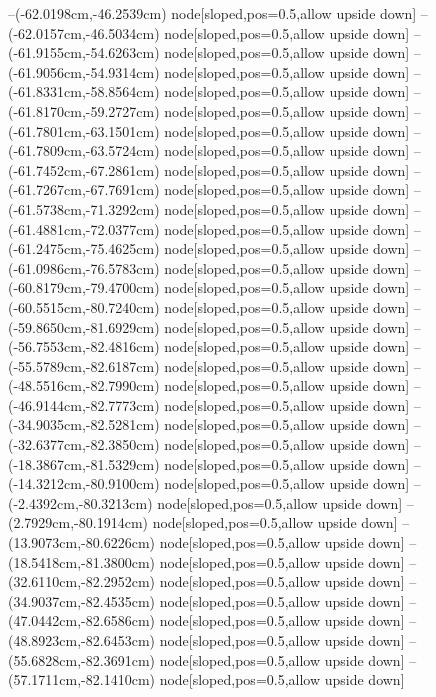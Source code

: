 --(-62.0198cm,-46.2539cm) node[sloped,pos=0.5,allow upside down]{\ArrowIn}
--(-62.0157cm,-46.5034cm) node[sloped,pos=0.5,allow upside down]{\arrowIn}
--(-61.9155cm,-54.6263cm) node[sloped,pos=0.5,allow upside down]{\ArrowIn}
--(-61.9056cm,-54.9314cm) node[sloped,pos=0.5,allow upside down]{\arrowIn}
--(-61.8331cm,-58.8564cm) node[sloped,pos=0.5,allow upside down]{\ArrowIn}
--(-61.8170cm,-59.2727cm) node[sloped,pos=0.5,allow upside down]{\arrowIn}
--(-61.7801cm,-63.1501cm) node[sloped,pos=0.5,allow upside down]{\ArrowIn}
--(-61.7809cm,-63.5724cm) node[sloped,pos=0.5,allow upside down]{\arrowIn}
--(-61.7452cm,-67.2861cm) node[sloped,pos=0.5,allow upside down]{\ArrowIn}
--(-61.7267cm,-67.7691cm) node[sloped,pos=0.5,allow upside down]{\arrowIn}
--(-61.5738cm,-71.3292cm) node[sloped,pos=0.5,allow upside down]{\ArrowIn}
--(-61.4881cm,-72.0377cm) node[sloped,pos=0.5,allow upside down]{\arrowIn}
--(-61.2475cm,-75.4625cm) node[sloped,pos=0.5,allow upside down]{\ArrowIn}
--(-61.0986cm,-76.5783cm) node[sloped,pos=0.5,allow upside down]{\ArrowIn}
--(-60.8179cm,-79.4700cm) node[sloped,pos=0.5,allow upside down]{\ArrowIn}
--(-60.5515cm,-80.7240cm) node[sloped,pos=0.5,allow upside down]{\ArrowIn}
--(-59.8650cm,-81.6929cm) node[sloped,pos=0.5,allow upside down]{\ArrowIn}
--(-56.7553cm,-82.4816cm) node[sloped,pos=0.5,allow upside down]{\ArrowIn}
--(-55.5789cm,-82.6187cm) node[sloped,pos=0.5,allow upside down]{\ArrowIn}
--(-48.5516cm,-82.7990cm) node[sloped,pos=0.5,allow upside down]{\ArrowIn}
--(-46.9144cm,-82.7773cm) node[sloped,pos=0.5,allow upside down]{\ArrowIn}
--(-34.9035cm,-82.5281cm) node[sloped,pos=0.5,allow upside down]{\ArrowIn}
--(-32.6377cm,-82.3850cm) node[sloped,pos=0.5,allow upside down]{\ArrowIn}
--(-18.3867cm,-81.5329cm) node[sloped,pos=0.5,allow upside down]{\ArrowIn}
--(-14.3212cm,-80.9100cm) node[sloped,pos=0.5,allow upside down]{\ArrowIn}
--(-2.4392cm,-80.3213cm) node[sloped,pos=0.5,allow upside down]{\ArrowIn}
--(2.7929cm,-80.1914cm) node[sloped,pos=0.5,allow upside down]{\ArrowIn}
--(13.9073cm,-80.6226cm) node[sloped,pos=0.5,allow upside down]{\ArrowIn}
--(18.5418cm,-81.3800cm) node[sloped,pos=0.5,allow upside down]{\ArrowIn}
--(32.6110cm,-82.2952cm) node[sloped,pos=0.5,allow upside down]{\ArrowIn}
--(34.9037cm,-82.4535cm) node[sloped,pos=0.5,allow upside down]{\ArrowIn}
--(47.0442cm,-82.6586cm) node[sloped,pos=0.5,allow upside down]{\ArrowIn}
--(48.8923cm,-82.6453cm) node[sloped,pos=0.5,allow upside down]{\ArrowIn}
--(55.6828cm,-82.3691cm) node[sloped,pos=0.5,allow upside down]{\ArrowIn}
--(57.1711cm,-82.1410cm) node[sloped,pos=0.5,allow upside down]{\ArrowIn}

